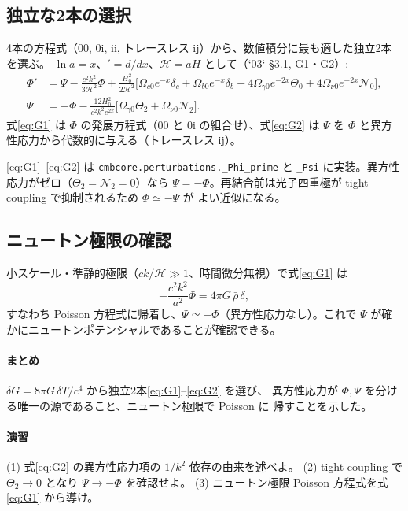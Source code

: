 \subsection{独立な2本の選択}
4本の方程式（00, 0i, ii, トレースレス ij）から、数値積分に最も適した独立2本を選ぶ。
$\ln a=x$、$' =d/dx$、$\mathcal H=aH$ として（`03` §3.1, G1・G2）:
\begin{align}
  \Phi' &= \Psi-\frac{c^2k^2}{3\mathcal H^2}\Phi
  +\frac{H_0^2}{2\mathcal H^2}\Big[\Omega_{c0}e^{-x}\delta_c+\Omega_{b0}e^{-x}\delta_b
  +4\Omega_{\gamma0}e^{-2x}\Theta_0+4\Omega_{\nu0}e^{-2x}\mathcal N_0\Big], \label{eq:G1}\\
  \Psi &= -\Phi-\frac{12H_0^2}{c^2k^2e^{2x}}\Big[\Omega_{\gamma0}\Theta_2
  +\Omega_{\nu0}\mathcal N_2\Big]. \label{eq:G2}
\end{align}
式\eqref{eq:G1} は $\Phi$ の発展方程式（00 と 0i の組合せ）、式\eqref{eq:G2} は
$\Psi$ を $\Phi$ と異方性応力から代数的に与える（トレースレス ij）。

\begin{numreality}
\eqref{eq:G1}--\eqref{eq:G2} は \texttt{cmbcore.perturbations.\_Phi\_prime} と
\texttt{\_Psi} に実装。異方性応力がゼロ（$\Theta_2=\mathcal N_2=0$）なら
$\Psi=-\Phi$。再結合前は光子四重極が tight coupling で抑制されるため $\Phi\simeq-\Psi$ が
よい近似になる。
\end{numreality}

\subsection{ニュートン極限の確認}
小スケール・準静的極限（$ck/\mathcal H\gg1$、時間微分無視）で式\eqref{eq:G1} は
\begin{equation}
  -\frac{c^2k^2}{a^2}\Phi=4\pi G\,\bar\rho\,\delta,
\end{equation}
すなわち Poisson 方程式に帰着し、$\Psi\simeq-\Phi$（異方性応力なし）。これで
$\Psi$ が確かにニュートンポテンシャルであることが確認できる。

\paragraph{まとめ}
$\delta G=8\pi G\,\delta T/c^4$ から独立2本\eqref{eq:G1}--\eqref{eq:G2} を選び、
異方性応力が $\Phi,\Psi$ を分ける唯一の源であること、ニュートン極限で Poisson に
帰すことを示した。

\paragraph{演習}
(1) 式\eqref{eq:G2} の異方性応力項の $1/k^2$ 依存の由来を述べよ。
(2) tight coupling で $\Theta_2\to0$ となり $\Psi\to-\Phi$ を確認せよ。
(3) ニュートン極限 Poisson 方程式を式\eqref{eq:G1} から導け。
